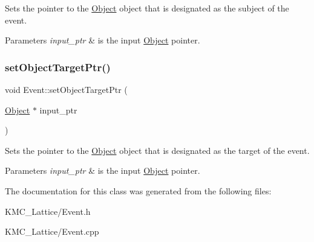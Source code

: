 Sets the pointer to the \hyperlink{class_object}{Object} object that is designated as the subject of the event. 


\begin{DoxyParams}{Parameters}
{\em input\+\_\+ptr} & is the input \hyperlink{class_object}{Object} pointer. \\
\hline
\end{DoxyParams}
\mbox{\label{class_event_a2e868dc951b6fec86703dcd7776680e0}} 
\subsubsection{\texorpdfstring{set\+Object\+Target\+Ptr()}{setObjectTargetPtr()}}
{\footnotesize\ttfamily void Event\+::set\+Object\+Target\+Ptr (\begin{DoxyParamCaption}\item[{\hyperlink{class_object}{Object} $\ast$}]{input\+\_\+ptr }\end{DoxyParamCaption})}



Sets the pointer to the \hyperlink{class_object}{Object} object that is designated as the target of the event. 


\begin{DoxyParams}{Parameters}
{\em input\+\_\+ptr} & is the input \hyperlink{class_object}{Object} pointer. \\
\hline
\end{DoxyParams}


The documentation for this class was generated from the following files\+:\begin{DoxyCompactItemize}
\item 
K\+M\+C\+\_\+\+Lattice/Event.\+h\item 
K\+M\+C\+\_\+\+Lattice/Event.\+cpp\end{DoxyCompactItemize}
